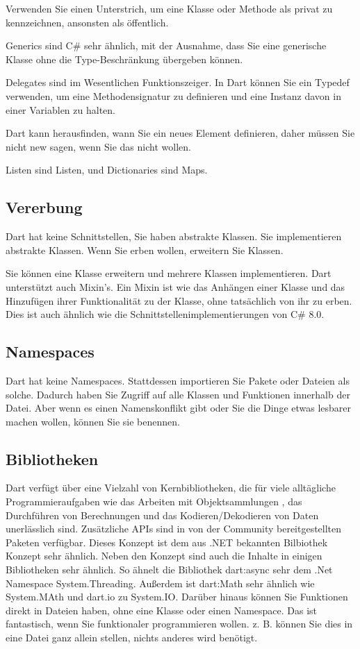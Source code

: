 Verwenden Sie einen Unterstrich, um eine Klasse oder Methode als privat zu kennzeichnen, ansonsten als öffentlich.

Generics sind C\# sehr ähnlich, mit der Ausnahme, dass Sie eine generische Klasse ohne die Type-Beschränkung übergeben können.

Delegates sind im Wesentlichen Funktionszeiger. In Dart können Sie ein Typedef verwenden, um eine Methodensignatur zu definieren und eine Instanz davon in einer Variablen zu halten.

Dart kann herausfinden, wann Sie ein neues Element definieren, daher müssen Sie nicht new sagen, wenn Sie das nicht wollen.

Listen sind Listen, und Dictionaries sind Maps.

\subsection{Vererbung}

Dart hat keine Schnittstellen, Sie haben abstrakte Klassen. Sie implementieren abstrakte Klassen.
Wenn Sie erben wollen, erweitern Sie Klassen.

Sie können eine Klasse erweitern und mehrere Klassen implementieren. Dart unterstützt auch Mixin's. Ein Mixin ist wie das Anhängen einer Klasse und das Hinzufügen ihrer Funktionalität zu der Klasse, ohne tatsächlich von ihr zu erben. Dies ist auch ähnlich wie die Schnittstellenimplementierungen von C\# 8.0.

\subsection{Namespaces}
Dart hat keine Namespaces. Stattdessen importieren Sie Pakete oder Dateien als solche.
Dadurch haben Sie Zugriff auf alle Klassen und Funktionen innerhalb der Datei. Aber wenn es einen Namenskonflikt gibt oder Sie die Dinge etwas lesbarer machen wollen, können Sie sie benennen.

\subsection{Bibliotheken}
Dart verfügt über eine Vielzahl von Kernbibliotheken, die für viele alltägliche Programmieraufgaben wie das Arbeiten mit Objektsammlungen , das Durchführen von Berechnungen und das Kodieren/Dekodieren von Daten  unerlässlich sind.  Zusätzliche APIs sind in von der Community bereitgestellten Paketen verfügbar. Dieses Konzept ist dem aus .NET bekannten Bilbiothek Konzept sehr ähnlich.
Neben den Konzept sind auch die Inhalte in einigen Bibliotheken sehr ähnlich. So ähnelt die Bibliothek dart:async sehr dem .Net Namespace System.Threading.  Außerdem ist dart:Math sehr ähnlich wie System.MAth und dart.io zu System.IO.
Darüber hinaus können Sie Funktionen direkt in Dateien haben, ohne eine Klasse oder einen Namespace. Das ist fantastisch, wenn Sie funktionaler programmieren wollen. z. B. können Sie dies in eine Datei ganz allein stellen, nichts anderes wird benötigt.

